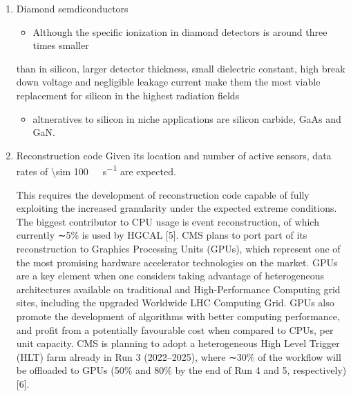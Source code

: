 \documentclass[11pt]{article}
\begin{document}
\begin{enumerate}
\begin{figure}
\texttt{[image: /home/bruno/org/PhD/Thesis/figures/hgcal/HGCAL3DView.pdf]}
\caption{\label{fig:hgcal_3d_view}Schmetic 3D view of one endcap of the \ac{HGCAL}. Different detector structural layers can be seen, such as the \ac{CE-E} and \ac{CE-H} calorimeters, the \ac{ETL} located just in front of the \ac{CE-E}, and some sections required for structural reasons. The \ac{PM}, or neutron moderator, reduces the number of neutron coming from the tracker. The two dashed lines give a rough idea on the location of one pair of cooling supply and return tubes, which are connected to the layers, and are placed every \SI{30}{\celsius}. The picture on the right provides a side view of the same endcap. Adapted from \cite{hgcalTDR}.}
\end{figure}
\item Diamond semdiconductors
\label{sec:orgf568b6d}
\begin{itemize}
\item Although the specific ionization in diamond detectors is around three times smaller
\end{itemize}
than in silicon, larger detector thickness, small dielectric constant, high break down
voltage and negligible leakage current make them the most viable replacement for
silicon in the highest radiation fields \cite{calorimetry_fabjan}
\begin{itemize}
\item altneratives to silicon in niche applications are silicon carbide, GaAs and GaN.
\end{itemize}
\item Reconstruction code
\label{sec:org4667400}
Given its location and number of active sensors, data rates of \SI{\sim 100}{\tera\byte\per\second} are expected.

This requires the development of reconstruction code capable of fully exploiting the increased granularity under the expected extreme conditions.
The biggest contributor to CPU usage is event reconstruction, of which currently ∼5\% is
used by HGCAL [5]. CMS plans to port part of its reconstruction to Graphics Processing
Units (GPUs), which represent one of the most promising hardware accelerator technologies on
the market. GPUs are a key element when one considers taking advantage of heterogeneous
architectures available on traditional and High-Performance Computing grid sites, including the
upgraded Worldwide LHC Computing Grid. GPUs also promote the development of algorithms
with better computing performance, and profit from a potentially favourable cost when compared
to CPUs, per unit capacity. CMS is planning to adopt a heterogeneous High Level Trigger (HLT)
farm already in Run 3 (2022–2025), where ∼30\% of the workflow will be offloaded to GPUs (50\%
and 80\% by the end of Run 4 and 5, respectively) [6]. 


\end{enumerate}
\end{document}
